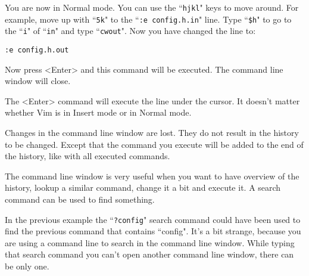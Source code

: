 You are now in Normal mode.
You can use the ``\texttt{hjkl}" keys to move around.
For example, move up with ``\texttt{5k}" to the ``\texttt{:e config.h.in}" line.
Type ``\texttt{\$h}" to go to the ``\texttt{i}" of ``\texttt{in}" and type ``\texttt{cwout}".
Now you have changed the line to:

\begin{Verbatim}[samepage=true]
    :e config.h.out
\end{Verbatim}

Now press <Enter> and this command will be executed.
The command line window will close.

The <Enter> command will execute the line under the cursor.
It doesn't matter whether Vim is in Insert mode or in Normal mode.

Changes in the command line window are lost.
They do not result in the history to be changed.
Except that the command you execute will be added to the end of the history, like with all executed commands.

The command line window is very useful when you want to have overview of the history, lookup a similar command, change it a bit and execute it.
A search command can be used to find something.

In the previous example the ``\texttt{?config}" search command could have been used to find the previous command that contains ``config".
It's a bit strange, because you are using a command line to search in the command line window.
While typing that search command you can't open another command line window, there can be only one.
\clearpage
